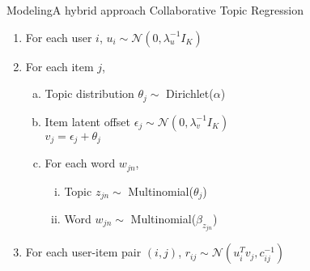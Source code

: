 \begin{frame}[c]{Modeling}{A hybrid approach}
	Collaborative Topic Regression
	\begin{enumerate}
		\item For each user $i$, $u_i \sim \mathcal{N}(0,\lambda_u^{-1}I_K)$
		\item For each item $j$,
			\begin{enumerate}[a)]
				\item Topic distribution $\theta_j \sim$ Dirichlet($\alpha$)
				\item Item latent offset $\epsilon_j \sim \mathcal{N}(0,\lambda_v^{-1}I_K)$\\
				$v_j=\epsilon_j+\theta_j$
				\item For each word $w_{jn}$,
					\begin{enumerate}[i.]
		    			\item Topic $z_{jn}\sim$ Multinomial($\theta_j$)
		    			\item Word $w_{jn}\sim$ Multinomial($\beta_{z_{jn}}$)
		    		\end{enumerate}
			\end{enumerate}
		\item For each user-item pair $(i,j)$, $r_{ij} \sim \mathcal{N}(u_i^Tv_j,c_{ij}^{-1})$
	\end{enumerate}
\end{frame}

